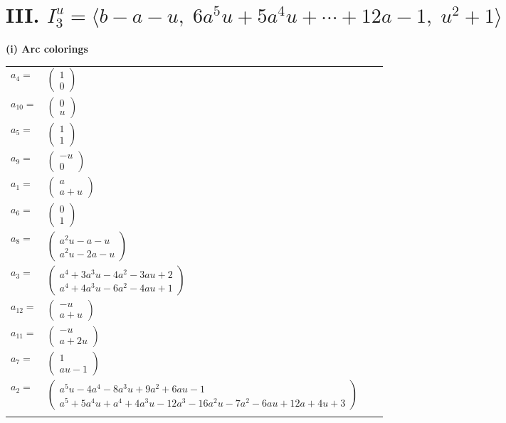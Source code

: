 \documentclass[1p]{elsarticle_modified}
\theoremstyle{definition}
\begin{document}
\centering \section*{III. $I^u_{3}= \langle b- a- u,\;6 a^5 u+5 a^4 u+\cdots+12 a-1,\;u^2+1 \rangle$}
\flushleft \textbf{(i) Arc colorings}\\
\begin{tabular}{m{7pt} m{180pt} m{7pt} m{180pt} }
\flushright $a_{4}=$&$\begin{pmatrix}1\\0\end{pmatrix}$ \\
\flushright $a_{10}=$&$\begin{pmatrix}0\\u\end{pmatrix}$ \\
\flushright $a_{5}=$&$\begin{pmatrix}1\\1\end{pmatrix}$ \\
\flushright $a_{9}=$&$\begin{pmatrix}- u\\0\end{pmatrix}$ \\
\flushright $a_{1}=$&$\begin{pmatrix}a\\a+u\end{pmatrix}$ \\
\flushright $a_{6}=$&$\begin{pmatrix}0\\1\end{pmatrix}$ \\
\flushright $a_{8}=$&$\begin{pmatrix}a^2 u- a- u\\a^2 u-2 a- u\end{pmatrix}$ \\
\flushright $a_{3}=$&$\begin{pmatrix}a^4+3 a^3 u-4 a^2-3 a u+2\\a^4+4 a^3 u-6 a^2-4 a u+1\end{pmatrix}$ \\
\flushright $a_{12}=$&$\begin{pmatrix}- u\\a+u\end{pmatrix}$ \\
\flushright $a_{11}=$&$\begin{pmatrix}- u\\a+2 u\end{pmatrix}$ \\
\flushright $a_{7}=$&$\begin{pmatrix}1\\a u-1\end{pmatrix}$ \\
\flushright $a_{2}=$&$\begin{pmatrix}a^5 u-4 a^4-8 a^3 u+9 a^2+6 a u-1\\a^5+5 a^4 u+a^4+4 a^3 u-12 a^3-16 a^2 u-7 a^2-6 a u+12 a+4 u+3\end{pmatrix}$\\&\end{tabular}
\end{document}
